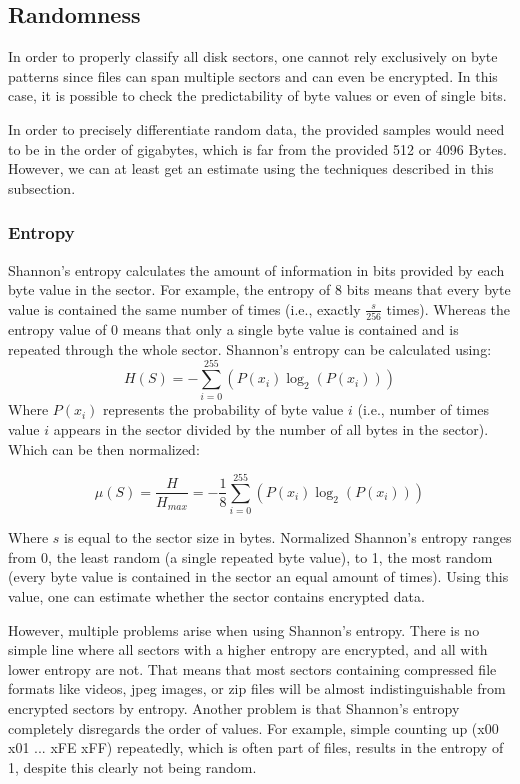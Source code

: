 \documentclass[
  digital, %
  oneside, %
  lof,     %
  lot,     %
]{fithesis4}
\begin{document}
\subsection{Randomness}
In order to properly classify all disk sectors, one cannot rely exclusively on byte patterns since files can span multiple sectors and can even be encrypted.
In this case, it is possible to check the predictability of byte values or even of single bits.

In order to precisely differentiate random data, the provided samples would need to be in the order of gigabytes, which is far from the provided 512 or 4096 Bytes.
However, we can at least get an estimate using the techniques described in this subsection.

\subsubsection{Entropy}
\label{sss:entropy}
Shannon's entropy calculates the amount of information in bits provided by each byte value in the sector.\cite{shannon48}
For example, the entropy of 8 bits means that every byte value is contained the same number of times (i.e., exactly $\frac{s}{256}$ times).
Whereas the entropy value of 0 means that only a single byte value is contained and is repeated through the whole sector. Shannon's entropy can be calculated using:
$$H(S) = -\sum_{i=0}^{255}(P(x_i)\log_2(P(x_i)))$$
Where $P(x_i)$ represents the probability of byte value $i$ (i.e., number of times value $i$ appears in the sector divided by the number of all bytes in the sector). Which can be then normalized:

$$\mu (S) = \frac{H}{H_{max}} = -\frac{1}{8}\sum_{i=0}^{255}(P(x_i)\log_2(P(x_i)))$$

Where $s$ is equal to the sector size in bytes.
Normalized Shannon's entropy ranges from 0, the least random (a single repeated byte value), to 1, the most random (every byte value is contained in the sector an equal amount of times).
Using this value, one can estimate whether the sector contains encrypted data. 

However,  multiple problems arise when using Shannon's entropy.
There is no simple line where all sectors with a higher entropy are encrypted, and all with lower entropy are not.
That means that most sectors containing compressed file formats like videos, jpeg images, or zip files will be almost indistinguishable from encrypted sectors by entropy.
Another problem is that Shannon's entropy completely disregards the order of values.
For example, simple counting up (x00 x01 ... xFE xFF) repeatedly, which is often part of files, results in the entropy of 1, despite this clearly not being random. 
\end{document}

